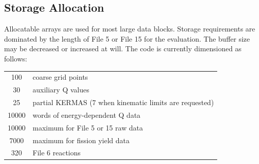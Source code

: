 \subsection{Storage Allocation}
\label{ssHEATR_storage}

Allocatable arrays are used for most large data blocks.  Storage
requirements are dominated by the length of File 5 or File 15 for
the evaluation. The  buffer size  may
be decreased or increased at will.  The code is
currently dimensioned as follows:

\begin{center}
\begin{tabular}{cl}
100 & coarse grid points \\
30 & auxiliary Q values \\
25 & partial KERMAS (7 when kinematic limits are requested) \\
10000 & words of energy-dependent Q data \\
10000 & maximum for File 5 or 15 raw data \\
7000 & maximum for fission yield data \\
320 & File 6 reactions
\end{tabular}
\end{center}

\cleardoublepage

